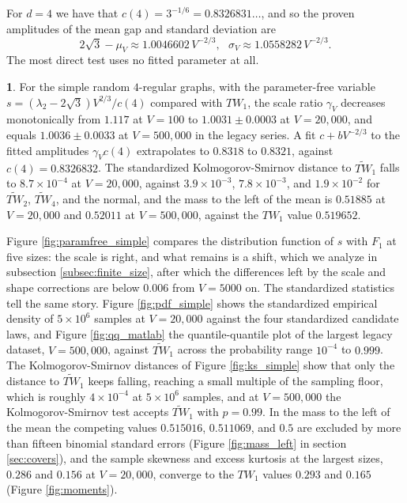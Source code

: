 \documentclass[12pt,oneside,english]{amsart}
\numberwithin{equation}{section}
\numberwithin{figure}{section}
\numberwithin{table}{section}
\theoremstyle{plain}
\numberwithin{thm}{section}
\theoremstyle{plain}
\theoremstyle{plain}
\theoremstyle{plain}
\theoremstyle{definition}
\theoremstyle{definition}
\newtheorem{numresult}[thm]{\protect\numresultname}
\theoremstyle{definition}
\theoremstyle{remark}
\providecommand{\numresultname}{Numerical Result}
\begin{document}
For $d=4$ we have that $c(4)=3^{-1/6}=0.8326831\dots$, and so the
proven amplitudes of the mean gap and standard deviation are
\begin{equation}
2\sqrt{3}-\mu_{V}\approx1.0046602\,V^{-2/3},\ \ \ \sigma_{V}\approx1.0558282\,V^{-2/3}.\label{eq:d4_amplitudes}
\end{equation}
The most direct test uses no fitted parameter at all.
\begin{numresult}
\label{nr:regular_law}For the simple random $4$-regular graphs, with
the parameter-free variable $s=(\lambda_{2}-2\sqrt{3})V^{2/3}/c(4)$
compared with $TW_{1}$, the scale ratio $\gamma_{V}$ decreases monotonically
from $1.117$ at $V=100$ to $1.0031\pm0.0003$ at $V=20{,}000$, and
equals $1.0036\pm0.0033$ at $V=500{,}000$ in the legacy series. A
fit $c+bV^{-2/3}$ to the fitted amplitudes $\gamma_{V}c(4)$ extrapolates
to $0.8318$ to $0.8321$, against $c(4)=0.8326832$. The standardized
Kolmogorov-Smirnov distance to $\widetilde{TW}_{1}$ falls to $8.7\times10^{-4}$
at $V=20{,}000$, against $3.9\times10^{-3}$, $7.8\times10^{-3}$,
and $1.9\times10^{-2}$ for $\widetilde{TW}_{2}$, $\widetilde{TW}_{4}$,
and the normal, and the mass to the left of the mean is $0.51885$
at $V=20{,}000$ and $0.52011$ at $V=500{,}000$, against the $TW_{1}$
value $0.519652$.
\end{numresult}
Figure \ref{fig:paramfree_simple} compares the distribution function
of $s$ with $F_{1}$ at five sizes: the scale is right, and what remains
is a shift, which we analyze in subsection \ref{subsec:finite_size},
after which the differences left by the scale and shape corrections
are below $0.006$ from $V=5000$ on. The standardized statistics tell
the same story. Figure \ref{fig:pdf_simple} shows the standardized
empirical density of $5\times10^{6}$ samples at $V=20{,}000$ against
the four standardized candidate laws, and Figure \ref{fig:qq_matlab}
the quantile-quantile plot of the largest legacy dataset, $V=500{,}000$,
against $\widetilde{TW}_{1}$ across the probability range $10^{-4}$
to $0.999$. The Kolmogorov-Smirnov distances of Figure \ref{fig:ks_simple}
show that only the distance to $\widetilde{TW}_{1}$ keeps falling,
reaching a small multiple of the sampling floor, which is roughly
$4\times10^{-4}$ at $5\times10^{6}$ samples, and at $V=500{,}000$
the Kolmogorov-Smirnov test accepts $\widetilde{TW}_{1}$ with $p=0.99$.
In the mass to the left of the mean the competing values $0.515016$,
$0.511069$, and $0.5$ are excluded by more than fifteen binomial standard
errors (Figure \ref{fig:mass_left} in section \ref{sec:covers}),
and the sample skewness and excess kurtosis at the largest sizes,
$0.286$ and $0.156$ at $V=20{,}000$, converge to the $TW_{1}$ values
$0.293$ and $0.165$ (Figure \ref{fig:moments}).
\end{document}
